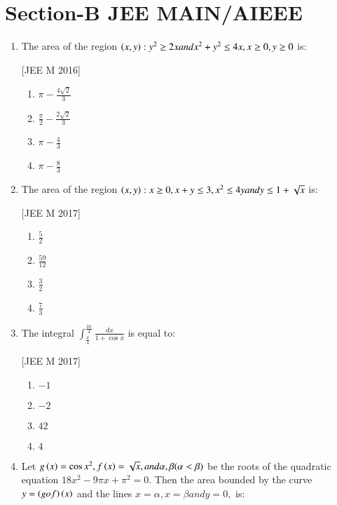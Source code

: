 \documentclass[journal,12pt,onecolumn]{IEEEtran}
\theoremstyle{remark}
\begin{document}
\section*{\textbf{Section-B} JEE MAIN/AIEEE }
\begin{enumerate}
	\item The area  of the region $\left(x,y\right):y^{2}\geq 2x and x^{2}+y^{2}\leq 4x, x\geq0, y\geq0$ is:

		\hfill{[JEE M 2016]}
		\begin{enumerate}
			\item $\pi - \frac{4\sqrt{2}}{3}$

			\item $\frac{\pi}{2}-\frac{2\sqrt{2}}{3}$

			\item $\pi - \frac{4}{3}$

			\item $\pi - \frac{8}{3}$
		\end{enumerate}
	\item The area  of the region $\left(x,y\right): x\geq0, x+y\leq3, x^{2}\leq4y and y\leq1+\sqrt{x}$ is:

		\hfill{[JEE M 2017]}
		\begin{enumerate}
			\item $\frac{5}{2}$

			\item $\frac{59}{12}$

			\item $\frac{3}{2}$

			\item $\frac{7}{3}$
		\end{enumerate}
	\item The integral $\int_{\frac{\pi}{4}}^{\frac{3\pi}{4}}\frac{dx}{1+\cos x}$ is equal to:

		\hfill{[JEE M 2017]}
		\begin{enumerate}
			\item $-1$
			\item $-2$
			\item $42$
			\item $4$
		\end{enumerate}
	\item Let $g\left(x\right)=\cos x^{2}, f\left(x\right)=\sqrt{x}, and \alpha, \beta (\alpha<\beta)$ be the roots of the quadratic equation $18x^{2}-9\pi x+\pi^{2}=0.$ Then the area  bounded by the curve $y=\left(gof\right)\left(x\right)$ and the lines $x=\alpha, x=\beta and y=0,$ is:


\end{enumerate}
\end{document}
